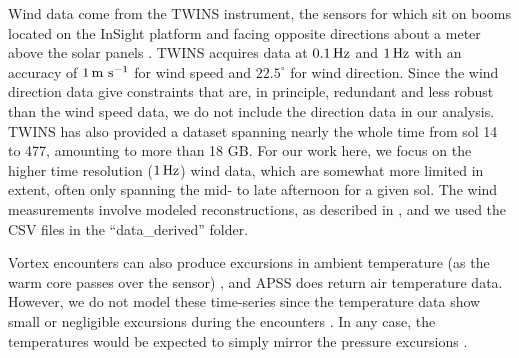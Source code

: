 \documentclass[linenumbers,trackchanges]{aastex63}
\begin{document}
Wind data come from the TWINS instrument, the sensors for which sit on booms located on the InSight platform and facing opposite directions about a meter above the solar panels \citep{2020NatGe..13..190B}. TWINS acquires data at $0.1\, {\rm Hz}$ and $1\, {\rm Hz}$ with an accuracy of $1\, {\rm m\ s^{-1}}$ for wind speed and $22.5^\circ$ for wind direction. Since the wind direction data give constraints that are, in principle, redundant and less robust than the wind speed data, we do not include the direction data in our analysis. TWINS has also provided a dataset spanning nearly the whole time from sol 14 to 477, amounting to more than 18 GB. For our work here, we focus on the higher time resolution ($1\, {\rm Hz}$) wind data, which are somewhat more limited in extent, often only spanning the mid- to late afternoon for a given sol. The wind measurements involve modeled reconstructions, as described in \citet{Banfield2019}, and we used the CSV files in the ``data\_derived'' folder. 

Vortex encounters can also produce excursions in ambient temperature (as the warm core passes over the sensor) \citep{2016SSRv..203...39M}, and APSS does return air temperature data. However, we do not model these time-series since the temperature data show small or negligible excursions during the encounters \citep{2021Icar..35514119L}. In any case, the temperatures would be expected to simply mirror the pressure excursions \citep{2016Icar..271..326L}.
\end{document}
